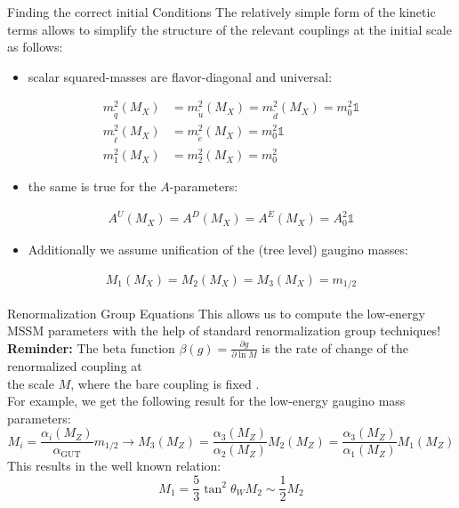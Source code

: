 \begin{frame}{Finding the correct initial Conditions}	
The relatively simple form of the kinetic terms allows to simplify the structure of the relevant couplings at the initial scale as follows:\\[1em]
	\begin{itemize}
		\item scalar squared-masses are \alert{flavor-diagonal} and \alert{universal}: 
	\end{itemize}
	\begin{align*}
				m^2_{\tilde{q}}(M_X) &= 	m^2_{\tilde{u}}(M_X) = m^2_{\tilde{d}}(M_X) = m_0^2 \mathbb{1} \\[0.5em]
				m^2_{\tilde{\ell}}(M_X) &= 	m^2_{\tilde{e}}(M_X) = m_0^2 \mathbb{1} \\[0.5em]
				m^2_{1}(M_X) &= 	m^2_{2}(M_X) = m_0^2 
	\end{align*}
		\begin{itemize}
		\item the same is true for the $A$-parameters:
	\end{itemize}
	\begin{align*}
				A^{U} (M_X) = A^{D} (M_X) = A^{E} (M_X) = A_0^2 \mathbb{1}
	\end{align*}
	\begin{itemize}
		\item Additionally we assume unification of the (tree level) gaugino masses:\\[1em]
		
		\end{itemize}
	 \begin{align*}
				M_1 (M_X) = M_2 (M_X) = M_3 (M_X) = m_{1/2} 
	\end{align*}
	\end{frame}

\begin{frame}{Renormalization Group Equations}
This allows us to compute the low-energy MSSM parameters with the help of standard \alert{renormalization group techniques}!\\[1em]

	\textbf{Reminder:} The \alert{beta function} $\beta(g)  = \frac{\partial g}{\partial \operatorname{ln} M}$ is the rate of change of the renormalized coupling at\\[0.3em] the scale $M$, where the bare coupling is fixed \cite{PeskinSchroeder1995}.\\[1em]
	For example, we get the following result for the low-energy gaugino mass parameters:
	\begin{equation*}
		M_{i}=\frac{\alpha_{i}\left(M_{Z}\right)}{\alpha_{\mathrm{GUT}}} m_{1 / 2} \longrightarrow M_{3}\left(M_{Z}\right)=\frac{\alpha_{3}\left(M_{Z}\right)}{\alpha_{2}\left(M_{Z}\right)} M_{2}\left(M_{Z}\right)=\frac{\alpha_{3}\left(M_{Z}\right)}{\alpha_{1}\left(M_{Z}\right)} M_{1}\left(M_{Z}\right)
	\end{equation*}
	This results in the well known relation: 
	\begin{equation*}
		M_{1}=\frac{5}{3} \operatorname{tan}^{2} \theta_{W} M_{2} \sim \frac{1}{2} M_{2}
	\end{equation*}
	\end{frame}

